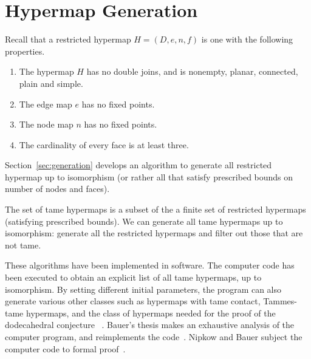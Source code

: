 \section{Hypermap Generation}\label{sec:hyper-gener}

Recall that a restricted hypermap  $H = (D,e,n,f)$ is one with the following
properties.
\begin{enumerate}
\item The hypermap $H$ has no double joins, and is nonempty, planar,
  connected, plain and simple.
\item The edge map $e$ has no fixed points.  %
\item The node map $n$ has no fixed points.
\item The cardinality of every face is at least three.
\end{enumerate}

Section~\ref{sec:generation} develops an algorithm to generate all
restricted hypermap up to isomorphism (or rather all that satisfy
prescribed bounds on number of nodes and faces).

The set of tame hypermaps is a subset of the a finite set of
restricted hypermaps (satisfying prescribed bounds).  We can generate
all tame hypermaps up to isomorphism: generate all the restricted
hypermaps and filter out those that are not tame.

These algorithms have been implemented in software.  The computer code
has been executed to obtain an explicit list of all tame hypermaps, up
to isomorphism.  By setting different initial parameters, the program
can also generate various other classes such as hypermaps with tame
contact, Tammes-tame hypermaps, and the class of hypermaps needed for
the proof of the dodecahedral conjecture
~\cite{Hales:2010:Dodec}. %
Bauer's thesis makes an exhaustive analysis of the computer
program, and reimplements the code~\cite{Bauer:2006:Thesis}.  Nipkow and
Bauer subject the computer code to formal proof~\cite{Nipkow:2005:Tame}.



